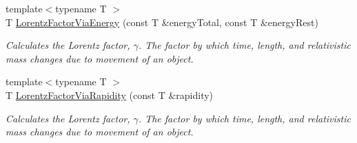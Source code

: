 \begin{DoxyCompactItemize}
{\footnotesize template$<$typename T $>$ }\\T \mbox{\hyperlink{group___e_g_x_phys-_lorentz_transformations_ga601de8c039be89a9abea22bc459436c9}{Lorentz\+Factor\+Via\+Energy}} (const T \&energy\+Total, const T \&energy\+Rest)
\begin{DoxyCompactList}\small\item\em Calculates the Lorentz factor, $\gamma$. The factor by which time, length, and relativistic mass changes due to movement of an object. \end{DoxyCompactList}\item 
{\footnotesize template$<$typename T $>$ }\\T \mbox{\hyperlink{group___e_g_x_phys-_lorentz_transformations_ga8064f5bce1d2ca5f7bc39d95ba4d2dd9}{Lorentz\+Factor\+Via\+Rapidity}} (const T \&rapidity)
\begin{DoxyCompactList}\small\item\em Calculates the Lorentz factor, $\gamma$. The factor by which time, length, and relativistic mass changes due to movement of an object. \end{DoxyCompactList}\end{DoxyCompactItemize}
